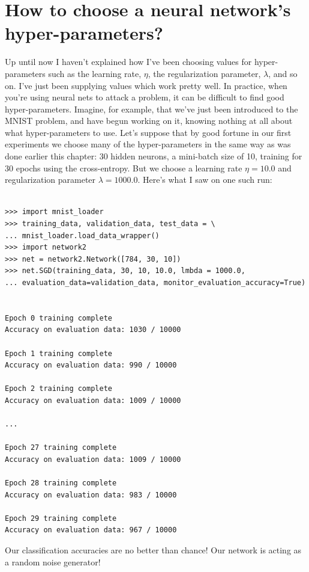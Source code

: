 \documentclass[a4paper,twoside,10pt]{book}
\begin{document}
\section{How to choose a neural network's hyper-parameters?}
\label{sec:3.5}
Up until now I haven't explained how I've been choosing values for hyper-parameters such as the learning rate, $\eta$, the regularization parameter, $\lambda$, and so on. I've just been supplying values which work pretty well. In practice, when you're using neural nets to attack a problem, it can be difficult to find good hyper-parameters. Imagine, for example, that we've just been introduced to the MNIST problem, and have begun working on it, knowing nothing at all about what hyper-parameters to use. Let's suppose that by good fortune in our first experiments we choose many of the hyper-parameters in the same way as was done earlier this chapter: 30 hidden neurons, a mini-batch size of 10, training for 30 epochs using the cross-entropy. But we choose a learning rate $\eta=10.0$ and regularization parameter $\lambda=1000.0$. Here's what I saw on one such run:

\begin{lstlisting}

>>> import mnist_loader
>>> training_data, validation_data, test_data = \
... mnist_loader.load_data_wrapper()
>>> import network2
>>> net = network2.Network([784, 30, 10])
>>> net.SGD(training_data, 30, 10, 10.0, lmbda = 1000.0,
... evaluation_data=validation_data, monitor_evaluation_accuracy=True)


Epoch 0 training complete
Accuracy on evaluation data: 1030 / 10000

Epoch 1 training complete
Accuracy on evaluation data: 990 / 10000

Epoch 2 training complete
Accuracy on evaluation data: 1009 / 10000

...

Epoch 27 training complete
Accuracy on evaluation data: 1009 / 10000

Epoch 28 training complete
Accuracy on evaluation data: 983 / 10000

Epoch 29 training complete
Accuracy on evaluation data: 967 / 10000
\end{lstlisting}
Our classification accuracies are no better than chance! Our network is acting as a random noise generator!
\end{document}
